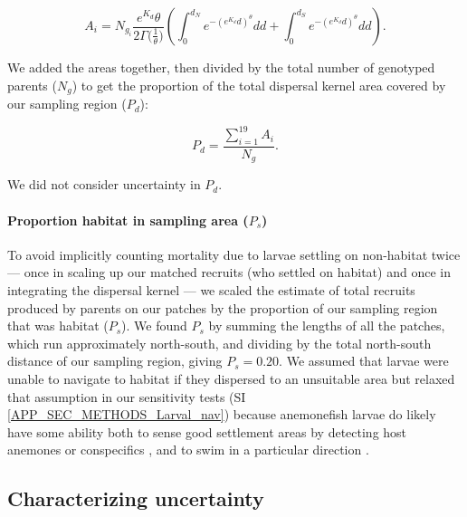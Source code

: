 \documentclass[12pt, oneside]{article}   	%
\begin{document}
\begin{equation} 
A_i = N_{g_i} \frac{e^{K_d}\theta}{2\Gamma({\frac{1}{\theta})}} \left( \int_{0}^{d_N}e^{-(e^{K_d}d)^\theta}  dd + \int_{0}^{d_S}e^{-(e^{K_d}d)^\theta}  dd \right). 
\end{equation}

We added the areas together, then divided by the total number of genotyped parents ($N_g$) to get the proportion of the total dispersal kernel area covered by our sampling region ($P_d$):

\begin{equation}
P_d = \frac{\sum_{i=1}^{19} A_i}{N_g}. \label{EQN_DK_area_within_sampling_region}
\end{equation}

We did not consider uncertainty in $P_d$.

\paragraph*{Proportion habitat in sampling area ($P_s$)} %

To avoid implicitly counting mortality due to larvae settling on non-habitat twice --- once in scaling up our matched recruits (who settled on habitat) and once in integrating the dispersal kernel --- we scaled the estimate of total recruits produced by parents on our patches by the proportion of our sampling region that was habitat ($P_s$). We found $P_s$ by summing the lengths of all the patches, which run approximately north-south, and dividing by the total north-south distance of our sampling region, giving $P_s = 0.20$. We assumed that larvae were unable to navigate to habitat if they dispersed to an unsuitable area but relaxed that assumption in our sensitivity tests (SI \ref{APP_SEC_METHODS_Larval_nav}) because anemonefish larvae do likely have some ability both to sense good settlement areas by detecting host anemones \citep{elliott1995host, arvedlund1999host} or conspecifics \citep[e.g.,][for coral reef fish more broadly]{lecchini2005experimental}, and to swim in a particular direction \citep[e.g.,][]{bellwood2001relative, fisher2005swimming}. 

\subsection{Characterizing uncertainty} \label{APP_SEC_Uncertainty}
\end{document}
